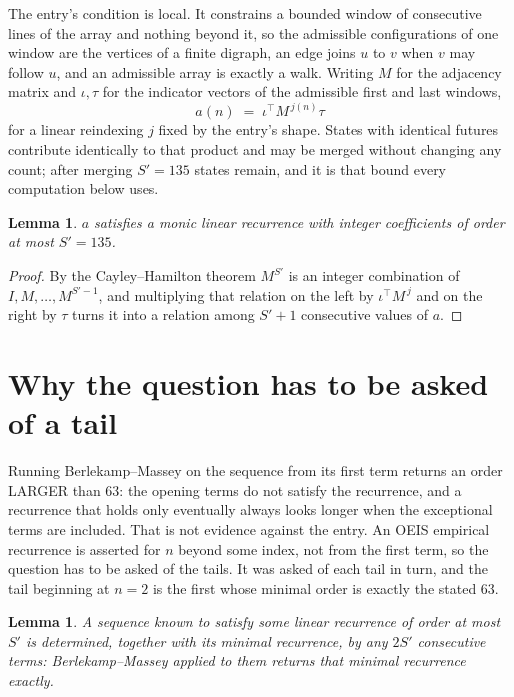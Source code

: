 \documentclass[11pt,a4paper]{article}
\theoremstyle{plain}
\newtheorem{lemma}[theorem]{Lemma}
\theoremstyle{definition}
\begin{document}
The entry's condition is local. It constrains a bounded window of consecutive lines of the
array and nothing beyond it, so the admissible configurations of one window are the vertices of
a finite digraph, an edge joins $u$ to $v$ when $v$ may follow $u$, and an admissible array is
exactly a walk. Writing $M$ for the adjacency matrix and $\iota,\tau$ for the indicator vectors
of the admissible first and last windows,
\[
a(n)\;=\;\iota^{\!\top}M^{\,j(n)}\tau
\]
for a linear reindexing $j$ fixed by the entry's shape. States with identical futures
contribute identically to that product and may be merged without changing any count; after
merging $S'=135$ states remain, and it is that bound every computation below uses.

\begin{lemma}\label{lem:cf}
$a$ satisfies a monic linear recurrence with integer coefficients of order at most $S'=135$.
\end{lemma}

\begin{proof}
By the Cayley--Hamilton theorem $M^{S'}$ is an integer combination of $I,M,\dots,M^{S'-1}$,
and multiplying that relation on the left by $\iota^{\!\top}M^{\,j}$ and on the right by
$\tau$ turns it into a relation among $S'+1$ consecutive values of $a$.
\end{proof}

\section{Why the question has to be asked of a tail}

Running Berlekamp--Massey on the sequence from its first term returns an order LARGER than $63$: the opening terms do not satisfy the recurrence, and a recurrence that holds only eventually always looks longer when the exceptional terms are included. That is not evidence against the entry. An OEIS empirical recurrence is asserted for $n$ beyond some index, not from the first term, so the question has to be asked of the tails. It was asked of each tail in turn, and the tail beginning at $n=2$ is the first whose minimal order is exactly the stated $63$.

\begin{lemma}\label{lem:bm}
A sequence known to satisfy some linear recurrence of order at most $S'$ is determined,
together with its minimal recurrence, by any $2S'$ consecutive terms: Berlekamp--Massey applied
to them returns that minimal recurrence exactly.
\end{lemma}
\end{document}
